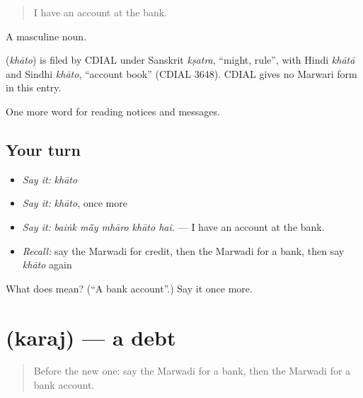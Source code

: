 \begin{quote}
I have an account at the bank.
\end{quote}

A masculine noun.

\begin{cousinweb}
\textbf{} (\emph{khāto}) is filed by CDIAL under Sanskrit \emph{kṣatra}, \textquotedblleft{}might, rule\textquotedblright{}, with Hindi \emph{khātā} and Sindhi \emph{khāto}, \textquotedblleft{}account book\textquotedblright{} (CDIAL 3648). CDIAL gives no Marwari form in this entry.
\end{cousinweb}

\begin{grammarlens}[title={What you've built}]
One more word for reading notices and messages.
\end{grammarlens}

\subsection*{Your turn}
\begin{itemize}
\raggedright
  \item \emph{Say it:} \emph{khāto}
  \item \emph{Say it:} \emph{khāto}, once more
  \item \emph{Say it:} \emph{baiṅk mā̃y mhāro khāto hai.} — I have an account at the bank.
  \item \emph{Recall:} say the Marwadi for credit, then the Marwadi for a bank, then say \emph{khāto} again
\end{itemize}

\begin{tcolorbox}[breakable,colback=teal!4,colframe=teal!35!black,title={Before you move on}]
What does  mean? (\textquotedblleft{}A bank account\textquotedblright{}.) Say it once more.
\end{tcolorbox}
\section[\texorpdfstring{\mw{करज} (karaj)}{करज (karaj)}]{ (karaj) — a debt}

\label{lesson:MW-C195-karaj}



\begin{quote}
Before the new one: say the Marwadi for a bank, then the Marwadi for a bank account.
\end{quote}

